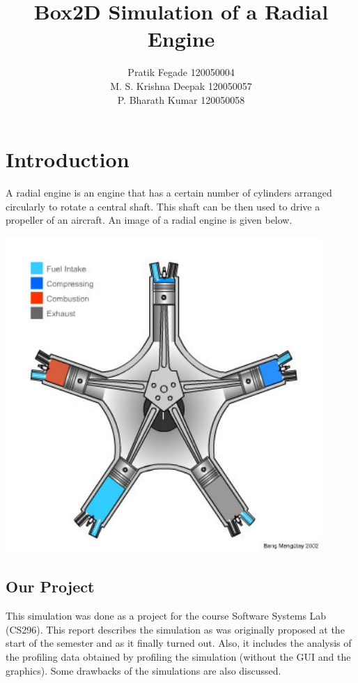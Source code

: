 \documentclass[11pt]{article}
\begin{document}
\vspace{5cm}
\title{Box2D Simulation of a Radial Engine}
\author{Pratik Fegade 120050004\\M. S. Krishna Deepak 120050057\\P. Bharath Kumar 120050058\\}
\maketitle
\pagebreak
\tableofcontents
\pagebreak
\section{Introduction}
A radial engine is an engine that has a certain number of cylinders arranged circularly to rotate a central shaft. This shaft can be then used to drive a propeller of an aircraft. An image\cite{radEng} of a radial engine is given below.

\begin{center}
	\includegraphics[width=12cm]{./images/radEng.jpeg}
\end{center}

\subsection{Our Project}
This simulation was done as a project for the course Software Systems Lab (CS296). This report describes the simulation as was originally proposed at the start of the semester and as it finally turned out. Also, it includes the analysis of the profiling data obtained by profiling the simulation (without the GUI and the graphics). Some drawbacks of the simulations are also discussed.
\end{document}

